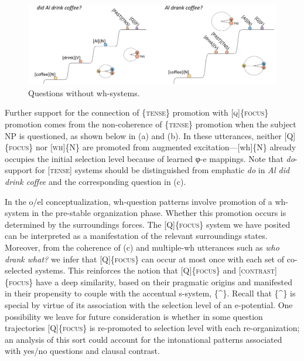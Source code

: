   
\begin{figure}
\includegraphics[width=\textwidth]{figures/Tilsen-img160.png}
\caption{Questions without wh-systems.}
\label{fig:7:16}
\end{figure}
 

  Further support for the connection of \{\textsc{tense}\} promotion with [\textsc{q}]\{\textsc{focus}\} promotion comes from the non-coherence of \{\textsc{tense}\} promotion when the subject NP is questioned, as shown below in (a) and (b). In these utterances, neither [Q]\{\textsc{focus}\} nor [\textsc{wh}]\{N\} are promoted from augmented excitation—[wh]\{N\} already occupies the initial selection level because of learned φ-e mappings. Note that \textit{do}{}-support for [\textsc{tense}] systems should be distinguished from emphatic \textit{do} in \textit{Al did drink coffee} and the corresponding question in (c).  

\ea
  \z
\z

  In the o/el conceptualization, wh-question patterns involve promotion of a wh-system in the pre-stable organization phase. Whether this promotion occurs is determined by the surroundings forces. The [\textsc{Q}]\{\textsc{focus}\} system we have posited can be interpreted as a manifestation of the relevant surroundings states. Moreover, from the coherence of (c) and multiple-wh utterances such as \textit{who drank what?} we infer that [Q]\{\textsc{focus}\} can occur at most once with each set of co-selected systems. This reinforces the notion that [Q]\{\textsc{focus}\} and [\textsc{contrast}]\{\textsc{focus}\} have a deep similarity, based on their pragmatic origins and manifested in their propensity to couple with the accentual s-system, \{\^{}\}. Recall that \{\^{}\} is special by virtue of its association with the selection level of an e-potential. One possibility we leave for future consideration is whether in some question trajectories [Q]\{\textsc{focus}\} is re-promoted to selection level with each re-organization; an analysis of this sort could account for the intonational patterns associated with yes/no questions and clausal contrast.

